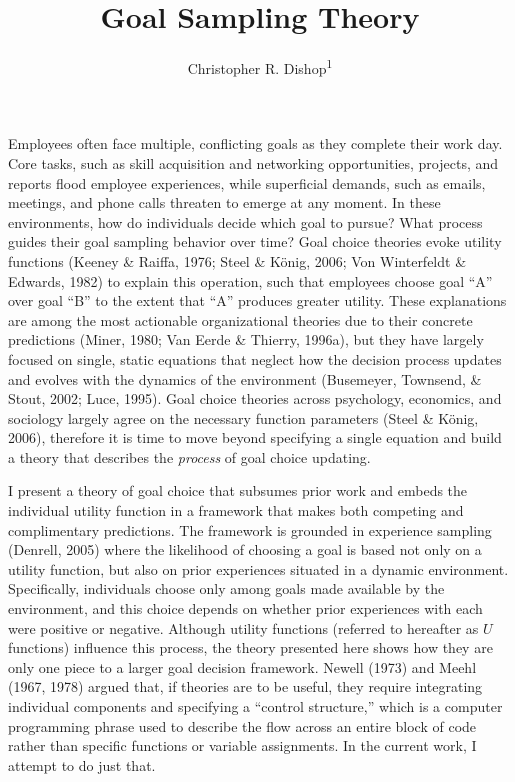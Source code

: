 \documentclass[english,man]{apa6}
\title{Goal Sampling Theory}
\author{Christopher R. Dishop\textsuperscript{1}}
\affiliation{
    \vspace{0.5cm}
          \textsuperscript{1} Michigan State University  }
\theoremstyle{definition}
\theoremstyle{definition}
\theoremstyle{definition}
\theoremstyle{remark}
\begin{document}
\maketitle

\setcounter{secnumdepth}{0}



Employees often face multiple, conflicting goals as they complete their
work day. Core tasks, such as skill acquisition and networking
opportunities, projects, and reports flood employee experiences, while
superficial demands, such as emails, meetings, and phone calls threaten
to emerge at any moment. In these environments, how do individuals
decide which goal to pursue? What process guides their goal sampling
behavior over time? Goal choice theories evoke utility functions (Keeney
\& Raiffa, 1976; Steel \& König, 2006; Von Winterfeldt \& Edwards, 1982)
to explain this operation, such that employees choose goal \enquote{A}
over goal \enquote{B} to the extent that \enquote{A} produces greater
utility. These explanations are among the most actionable organizational
theories due to their concrete predictions (Miner, 1980; Van Eerde \&
Thierry, 1996a), but they have largely focused on single, static
equations that neglect how the decision process updates and evolves with
the dynamics of the environment (Busemeyer, Townsend, \& Stout, 2002;
Luce, 1995). Goal choice theories across psychology, economics, and
sociology largely agree on the necessary function parameters (Steel \&
König, 2006), therefore it is time to move beyond specifying a single
equation and build a theory that describes the \emph{process} of goal
choice updating.

I present a theory of goal choice that subsumes prior work and embeds
the individual utility function in a framework that makes both competing
and complimentary predictions. The framework is grounded in experience
sampling (Denrell, 2005) where the likelihood of choosing a goal is
based not only on a utility function, but also on prior experiences
situated in a dynamic environment. Specifically, individuals choose only
among goals made available by the environment, and this choice depends
on whether prior experiences with each were positive or negative.
Although utility functions (referred to hereafter as \(U\) functions)
influence this process, the theory presented here shows how they are
only one piece to a larger goal decision framework. Newell (1973) and
Meehl (1967, 1978) argued that, if theories are to be useful, they
require integrating individual components and specifying a
\enquote{control structure,} which is a computer programming phrase used
to describe the flow across an entire block of code rather than specific
functions or variable assignments. In the current work, I attempt to do
just that.
\end{document}
